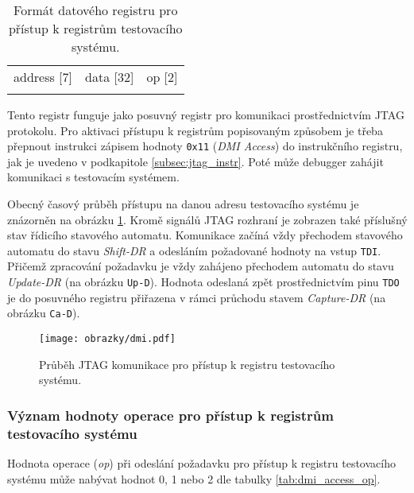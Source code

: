 \begin{table}[H]
  \caption{Formát datového registru pro přístup k registrům testovacího systému. \cite{risc-v_dbg}}
  \begin{center}
  	\small
	  \begin{tabular}{!{\vrule width 1.2pt}M{2cm}|M{10.5cm}|M{1cm}!{\vrule width 1.2pt}}
				\\
				\hline
				address [7] & data [32] & op [2]\\
				\hline
		\end{tabular}
  \end{center}
	\label{tab:dmi_access}
\end{table}

Tento registr funguje jako posuvný registr pro komunikaci prostřednictvím \acs{JTAG} protokolu. Pro aktivaci přístupu k registrům popisovaným způsobem je třeba přepnout instrukci zápisem hodnoty \texttt{0x11} (\textit{DMI Access}) do instrukčního registru, jak je uvedeno v podkapitole \ref{subsec:jtag_instr}. Poté může debugger zahájit komunikaci s testovacím systémem.
 
Obecný časový průběh přístupu na danou adresu testovacího systému je znázorněn na obrázku \ref{fig:dmi}. Kromě signálů \acs{JTAG} rozhraní je zobrazen také příslušný stav řídicího stavového automatu. Komunikace začíná vždy přechodem stavového automatu do stavu \textit{Shift-DR} a odesláním požadované hodnoty na vstup \texttt{TDI}. Přičemž zpracování požadavku je vždy zahájeno přechodem automatu do stavu \textit{Update-DR} (na obrázku \texttt{Up-D}). Hodnota odeslaná zpět prostřednictvím pinu \texttt{TDO} je do posuvného registru přiřazena v rámci průchodu stavem \textit{Capture-DR} (na obrázku \texttt{Ca-D}). \cite{risc-v_dbg}


\begin{figure}[!h]
  \begin{center}
    \texttt{[image: obrazky/dmi.pdf]}
  \end{center}
  \caption{Průběh \acs{JTAG} komunikace pro přístup k registru testovacího systému.}
	\label{fig:dmi}
\end{figure}

\subsubsection{Význam hodnoty operace pro přístup k registrům testovacího systému}
Hodnota operace (\textit{op}) při odeslání požadavku pro přístup k registru testovacího systému může nabývat hodnot 0, 1 nebo 2 dle tabulky \ref{tab:dmi_access_op}.

